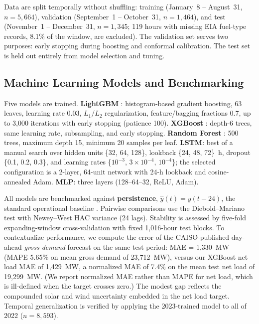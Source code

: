 \documentclass[preprint,12pt,authoryear]{elsarticle}
\begin{document}
Data are split temporally without shuffling: training (January~8 -- August~31, $n = 5{,}664$), validation (September~1 -- October~31, $n = 1{,}464$), and test (November~1 -- December~31, $n = 1{,}345$; 119 hours with missing EIA fuel-type records, 8.1\% of the window, are excluded). The validation set serves two purposes: early stopping during boosting and conformal calibration. The test set is held out entirely from model selection and tuning.

\subsection{Machine Learning Models and Benchmarking}
\label{sec:ml}

Five models are trained. \textbf{LightGBM} \citep{ke2017}: histogram-based gradient boosting, 63 leaves, learning rate 0.03, $L_1/L_2$ regularization, feature/bagging fractions 0.7, up to 3{,}000 iterations with early stopping (patience 100). \textbf{XGBoost} \citep{chen2016}: depth-6 trees, same learning rate, subsampling, and early stopping. \textbf{Random Forest} \citep{breiman2001}: 500 trees, maximum depth 15, minimum 20 samples per leaf. \textbf{LSTM}: best of a manual search over hidden units \{32, 64, 128\}, lookback \{24, 48, 72\}~h, dropout \{0.1, 0.2, 0.3\}, and learning rates \{$10^{-3}$, $3\times10^{-4}$, $10^{-4}$\}; the selected configuration is a 2-layer, 64-unit network with 24-h lookback and cosine-annealed Adam. \textbf{MLP}: three layers (128--64--32, ReLU, Adam).

All models are benchmarked against \textbf{persistence}, $\hat{y}(t) = y(t-24)$, the standard operational baseline \citep{hong2016}. Pairwise comparisons use the Diebold--Mariano test \citep{diebold1995} with Newey--West HAC variance (24 lags). Stability is assessed by five-fold expanding-window cross-validation \citep{bergmeir2012} with fixed 1{,}016-hour test blocks. To contextualize performance, we compute the error of the CAISO-published day-ahead \emph{gross demand} forecast on the same test period: MAE = 1{,}330~MW (MAPE 5.65\% on mean gross demand of 23{,}712~MW), versus our XGBoost net load MAE of 1{,}429~MW, a normalized MAE of 7.4\% on the mean test net load of 19{,}299~MW. (We report normalized MAE rather than MAPE for net load, which is ill-defined when the target crosses zero.) The modest gap reflects the compounded solar and wind uncertainty embedded in the net load target. Temporal generalization is verified by applying the 2023-trained model to all of 2022 ($n = 8{,}593$).
\end{document}
